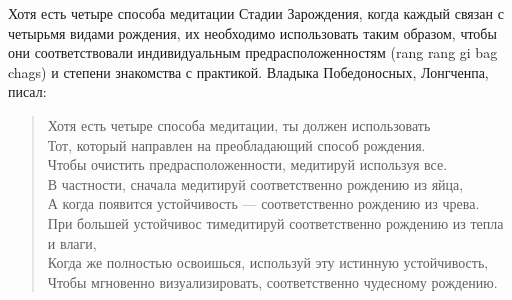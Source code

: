 Хотя есть четыре способа медитации Стадии Зарождения, когда каждый связан с
четырьмя видами рождения, их необходимо использовать таким образом, чтобы они
соответствовали индивидуальным предрасположенностям (rang rang gi bag chags) и степени
знакомства с практикой. Владыка Победоносных, Лонгченпа, писал:\\

\begin{verse}
\small
Хотя есть четыре способа медитации, ты должен использовать \\
Тот, который направлен на преобладающий способ рождения. \\
Чтобы очистить предрасположенности, медитируй используя все.\\
В частности, сначала медитируй соответственно рождению из яйца,\\
А когда появится устойчивость — соответственно рождению из чрева.\\
При большей устойчивос тимедитируй соответственно рождению из тепла и влаги,\\
Когда же полностью освоишься, используй эту истинную устойчивость,\\
Чтобы мгновенно визуализировать, соответственно чудесному рождению.
\normalsize
\end{verse}
